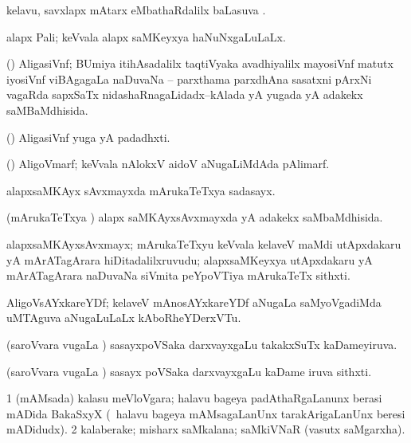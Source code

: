 \bentry
{}
\gl{\sapUpa}
\bmng
kelavu, savxlapx mAtarx eMbathaRdalilx baLasuva \sapUpa. 
\emng
\eentry

\bentry
{}
\gl{\gu}
\bmng
 alapx Pali; keVvala alapx saMKeyxya haNuNxgaLuLaLx. 
\emng
\eentry

\bentry
{}
\gl{\gu}
\bmng
(\BUvi) AligasiVnf; BUmiya itihAsadalilx taqtiVyaka avadhiyalilx mayosiVnf matutx iyosiVnf viBAgagaLa naDuvaNa -- parxthama parxdhAna sasatxni pArxNi vagaRda sapxSaTx nidashaRnagaLidadx--kAlada yA yugada yA adakekx saMBaMdhisida. 
\emng
\eentry

\bentry
{}
\gl{\nA}
\bmng
(\BUvi) AligasiVnf yuga yA padadhxti. 
\emng
\eentry

\bentry
{}
\gl{\nA}
\bmng
(\ravi) AligoVmarf; keVvala nAlokxV aidoV aNugaLiMdAda pAlimarf. 
\emng
\eentry

\bentry
{}
\gl{\nA}
\bmng
alapxsaMKAyx sAvxmayxda mArukaTeTxya sadasayx. 
\emng
\eentry

\bentry
{}
\gl{\gu}
\bmng
(mArukaTeTxya \vi) alapx saMKAyxsAvxmayxda yA adakekx saMbaMdhisida. 
\emng
\eentry

\bentry
{}
\gl{\nA}
\bmng
alapxsaMKAyxsAvxmayx; mArukaTeTxyu keVvala kelaveV maMdi utApxdakaru yA mArATagArara hiDitadalilxruvudu; alapxsaMKeyxya utApxdakaru yA mArATagArara naDuvaNa siVmita peYpoVTiya mArukaTeTx sithxti. 
\emng
\eentry

\bentry
{}
\gl{\nA}
\bmng
AligoVsAYxkareYDf; kelaveV mAnosAYxkareYDf aNugaLa saMyoVgadiMda uMTAguva aNugaLuLaLx kAboRheYDerxVTu. 
\emng
\eentry

\bentry
{}
\gl{\gu}
\bmng
(saroVvara \mo vugaLa \vi) sasayxpoVSaka darxvayxgaLu takakxSuTx kaDameyiruva. 
\emng
\eentry

\bentry
{}
\gl{\nA}
\bmng
(saroVvara \mo vugaLa \vi) sasayx poVSaka darxvayxgaLu kaDame iruva sithxti. 
\emng
\eentry

\bentry
{}
\gl{\nA}
\bmng
\bnum
\num{1} (mAMsada) kalasu meVloVgara; halavu bageya padAthaRgaLanunx berasi mADida BakaSxyX (\kanmu\ halavu bageya mAMsagaLanUnx tarakArigaLanUnx beresi mADidudx). 
\num{2} kalaberake; misharx saMkalana; saMkiVNaR (vasutx saMgarxha). 
\enum
\emng
\eentry


